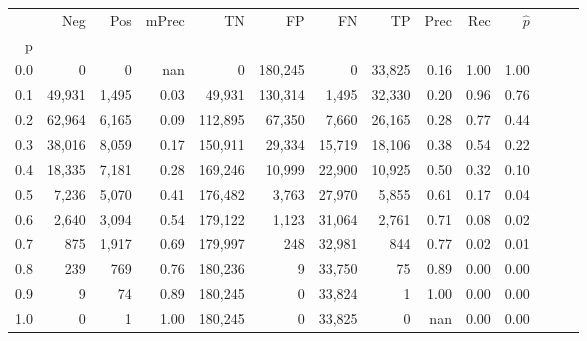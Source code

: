 \begin{tabular}{rrrrrrrrrrrrrr}
\toprule
{} &     Neg &    Pos & mPrec &       TN &       FP &      FN &      TP &  Prec &   Rec & $\hat{p}$ \\
p   &         &        &       &          &          &         &         &       &       &           \\
\midrule
0.0 &       0 &      0 &   nan &        0 &  180,245 &       0 &  33,825 &  0.16 &  1.00 &      1.00 \\
0.1 &  49,931 &  1,495 &  0.03 &   49,931 &  130,314 &   1,495 &  32,330 &  0.20 &  0.96 &      0.76 \\
0.2 &  62,964 &  6,165 &  0.09 &  112,895 &   67,350 &   7,660 &  26,165 &  0.28 &  0.77 &      0.44 \\
0.3 &  38,016 &  8,059 &  0.17 &  150,911 &   29,334 &  15,719 &  18,106 &  0.38 &  0.54 &      0.22 \\
0.4 &  18,335 &  7,181 &  0.28 &  169,246 &   10,999 &  22,900 &  10,925 &  0.50 &  0.32 &      0.10 \\
0.5 &   7,236 &  5,070 &  0.41 &  176,482 &    3,763 &  27,970 &   5,855 &  0.61 &  0.17 &      0.04 \\
0.6 &   2,640 &  3,094 &  0.54 &  179,122 &    1,123 &  31,064 &   2,761 &  0.71 &  0.08 &      0.02 \\
0.7 &     875 &  1,917 &  0.69 &  179,997 &      248 &  32,981 &     844 &  0.77 &  0.02 &      0.01 \\
0.8 &     239 &    769 &  0.76 &  180,236 &        9 &  33,750 &      75 &  0.89 &  0.00 &      0.00 \\
0.9 &       9 &     74 &  0.89 &  180,245 &        0 &  33,824 &       1 &  1.00 &  0.00 &      0.00 \\
1.0 &       0 &      1 &  1.00 &  180,245 &        0 &  33,825 &       0 &   nan &  0.00 &      0.00 \\
\bottomrule
\end{tabular}
